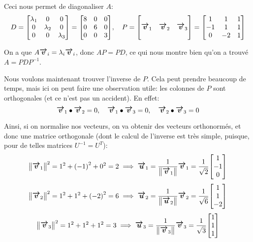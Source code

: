 \documentclass[a4paper]{article}
\begin{document}
{    Ceci nous permet de diagonaliser $A$: 
    \[D = \begin{bmatrix} \lambda_1 & 0 & 0 \\ 0 & \lambda_2 & 0 \\ 0 & 0 & \lambda_3 \end{bmatrix} = \begin{bmatrix} 8 & 0 & 0 \\ 0 & 6 & 0 \\ 0 & 0 & 3 \end{bmatrix}, \mathspace P = \begin{bmatrix}  &  &  \\ \bvec{v}_1 & \bvec{v}_2 & \bvec{v}_3 \\  &  &  \end{bmatrix} = \begin{bmatrix} 1 & 1 & 1 \\ -1 & 1 & 1 \\ 0 & -2 & 1 \end{bmatrix} \]
    
    On a que $A \bm{\protect\overrightarrow{v}}_i = \lambda_i \bm{\protect\overrightarrow{v}}_i$, donc $AP = PD$, ce qui nous montre bien qu'on a trouvé $A = PDP^{-1}$.

    Nous voulons maintenant trouver l'inverse de $P$. Cela peut prendre beaucoup de temps, mais ici on peut faire une observation utile: les colonnes de $P$ sont orthogonales (et ce n'est pas un accident). En effet: 
    \[\bm{\protect\overrightarrow{v}}_1 \bullet \bm{\protect\overrightarrow{v}}_2 = 0, \quad \bm{\protect\overrightarrow{v}}_1 \bullet \bm{\protect\overrightarrow{v}}_3 = 0, \quad \bm{\protect\overrightarrow{v}}_2 \bullet \bm{\protect\overrightarrow{v}}_3 = 0\]

    Ainsi, si on normalise nos vecteurs, on va obtenir des vecteurs orthonormés, et donc une matrice orthogonale (dont le calcul de l'inverse est très simple, puisque, pour de telles matrices $U^{-1} = U^T$): 
    \[\left\|\bvec{v}_1\right\|^2 = 1^2 + \left(-1\right)^2 + 0^2 = 2 \implies \bvec{u}_1 = \frac{1}{\left\|\bvec{v}_1\right\|} \bvec{v}_1 = \frac{1}{\sqrt{2}} \begin{bmatrix} 1 \\ -1 \\ 0 \end{bmatrix} \]
    \[\left\|\bvec{v}_2\right\|^2 = 1^2 + 1^2 + \left(-2\right)^2 = 6 \implies \bvec{u}_2 = \frac{1}{\left\|\bvec{u}_2\right\|} \bvec{v}_2 = \frac{1}{\sqrt{6}} \begin{bmatrix} 1 \\ 1 \\ -2 \end{bmatrix} \]
    \[\left\|\bvec{v}_3\right\|^2 = 1^2 + 1^2 + 1^2 = 3 \implies \bvec{u}_3 = \frac{1}{\left\|\bvec{v}_3\right\|} \bvec{v}_3 = \frac{1}{\sqrt{3}} \begin{bmatrix} 1 \\ 1 \\ 1 \end{bmatrix} \]
    
}
\end{document}
